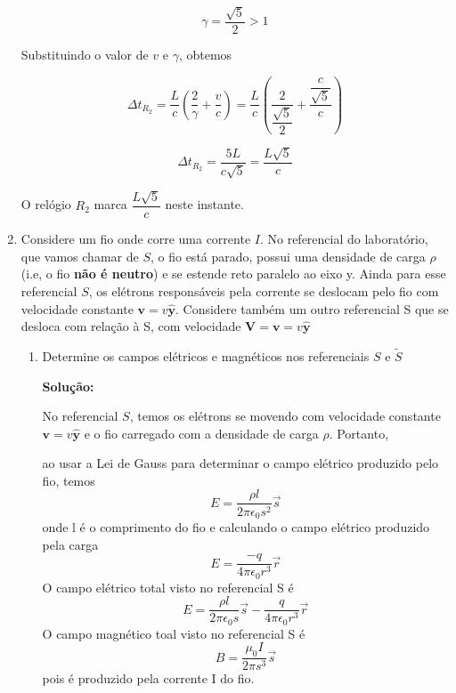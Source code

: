 \documentclass[10pt,a4paper]{article}
\begin{document}
\begin{enumerate}
	\begin{equation*}
		\gamma = \dfrac{\sqrt{5}}{2} > 1
	\end{equation*}
	
	Substituindo o valor de $ v $ e $ \gamma $, obtemos
	
	\begin{equation*}
		\Delta t_{R_2}  = \dfrac{L}{c} (\dfrac{2}{\gamma} + \dfrac{v}{c}) = \dfrac{L}{c} (\dfrac{2}{ \dfrac{\sqrt{5}}{2}} + \dfrac{\dfrac{c}{\sqrt{5}}}{c})
	\end{equation*}

	\begin{equation*}
		\Delta t_{R_2}  = \dfrac{5L}{c\sqrt{5}} = \dfrac{L\sqrt{5}}{c}
	\end{equation*}

	O relógio $ R_2 $ marca $\dfrac{L\sqrt{5}}{c}  $ neste instante.
	
	\item Considere um fio onde corre uma corrente $I$. No referencial do laboratório, que vamos chamar de $S$, o fio está parado, possui uma densidade de carga $\rho$ (i.e, o fio \textbf{não é neutro}) e se estende reto paralelo ao eixo y. Ainda para esse referencial $S$, os elétrons responsáveis pela corrente se deslocam pelo fio com velocidade constante $\mathbf{v} =v \mathbf{\hat{y}}$. Considere também um outro referencial S que se desloca com relação à S, com velocidade $\mathbf{V} = \mathbf{v} = v\mathbf{\hat{y}}$
	\begin{enumerate}
		\item Determine os campos elétricos e magnéticos nos referenciais $S$ e $\tilde{S}$
		
		\textbf{Solução: }
		
		No referencial $ S $, temos os elétrons se movendo com velocidade constante $\mathbf{v} =v \mathbf{\hat{y}}$ e o fio carregado com a densidade de carga $\rho$. Portanto,
		
		ao usar a Lei de Gauss para determinar o campo elétrico produzido pelo fio, temos
		\begin{equation*}
			E = \dfrac{\rho l}{2\pi \epsilon_0s^2 }\vec{s}
		\end{equation*}
		onde l é o comprimento do fio e calculando o campo elétrico produzido pela carga
		\begin{equation*}
			E = \dfrac{-q}{4\pi \epsilon_0 r^3}\vec{r}
		\end{equation*}
		O campo elétrico total visto no referencial S é
		\begin{equation*}
			E = \dfrac{\rho l}{2\pi \epsilon_0s }\vec{s}-\dfrac{q}{4\pi \epsilon_0 r^3}\vec{r}
		\end{equation*}
		O campo magnético toal visto no referencial S é
		\begin{equation*}
			B = \dfrac{\mu_0 I}{2\pi s^3}\vec{s} 
		\end{equation*}
		pois é produzido pela corrente I do fio.
		

\end{enumerate}
\end{enumerate}
\end{document}

